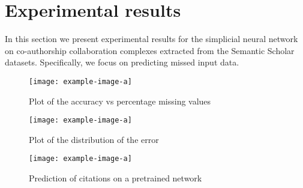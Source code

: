 \section{Experimental results}
In this section we present experimental results for the simplicial neural network on co-authorship collaboration complexes extracted from the Semantic Scholar datasets. Specifically, we focus on predicting missed input data.


\begin{figure}[htbp]
  \centering
  
\texttt{[image: example-image-a]}
  \caption{Plot of the accuracy vs percentage missing values } \label{fig:error}
\end{figure}

\begin{figure}[htbp]
  \centering
  
\texttt{[image: example-image-a]}
  \caption{Plot of the distribution of the error} \label{fig:error}
\end{figure}

\begin{figure}[htbp]
  \centering
  
\texttt{[image: example-image-a]}
  \caption{Prediction of citations on a pretrained network} \label{fig:error}
\end{figure}